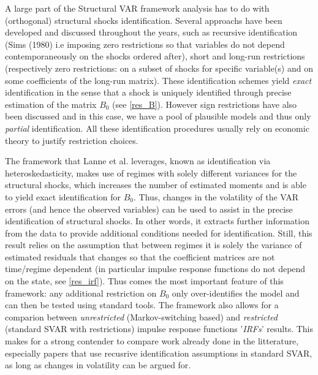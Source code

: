\quad A large part of the Structural VAR framework analysis has to do with (orthogonal) structural shocks identification. 
Several approachs have been developed and discussed throughout the years, such as recursive identification (Sims (1980) \cite{Sims} i.e imposing zero restrictions so that variables do not depend contemporaneously on the shocks ordered after), short and long-run restrictions (respectively zero restrictions: on a subset of shocks for specific variable(s) and on some coefficients of the long-run matrix).
These identification schemes yield \textit{exact} identification in the sense that a shock is uniquely identified through precise estimation of the matrix $B_0$ (see \ref{res_B}). 
However sign restrictions have also been discussed and in this case, we have a pool of plausible models and thus only \textit{partial} identification. 
All these identification procedures usually rely on economic theory to justify restriction choices.

\bigbreak

The framework that Lanne et al. \cite{LANNE} leverages, known as identification via heteroskedasticity, makes use of regimes with solely different variances for the structural shocks, which increases the number of estimated moments and is able to yield exact identification for $B_0$.
Thus, changes in the volatility of the VAR errors (and hence the observed variables) can be used to assist in the precise identification of structural shocks. 
In other words, it extracts further information from the data to provide additional conditions needed for identification.
Still, this result relies on the assumption that between regimes it is solely the variance of estimated residuals that changes so that the coefficient matrices are not time/regime dependent (in particular impulse response functions do not depend on the state, see \ref{res_irf}). 
Thus comes the most important feature of this framework: any additional restriction on $B_0$ only over-identifies the model and can then be tested using standard tools\footnotemark.  
The framework also allows for a comparion between \textit{unrestricted} (Markov-switching based) and \textit{restricted} (standard SVAR with restrictions) impulse response functions '\textit{IRFs}' results.
This makes for a strong contender to compare work already done in the litterature, especially papers that use recusrive identification assumptions in standard SVAR, as long as changes in volatility can be argued for.

